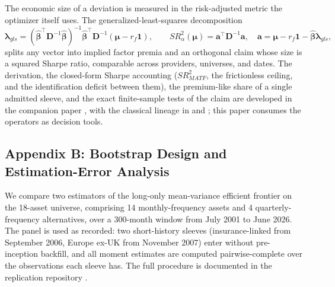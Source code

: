 \documentclass[pdftex,12pt,a4paper]{article}
\begin{document}
The economic size of a deviation is measured in the risk-adjusted metric the optimizer itself uses. The generalized-least-squares decomposition
\begin{equation}\label{eq:gls}
	\boldsymbol\lambda_{gls} = (\hat{\boldsymbol\beta}^\intercal \boldsymbol D^{-1} \hat{\boldsymbol\beta})^{-1}\hat{\boldsymbol\beta}^\intercal \boldsymbol D^{-1}(\boldsymbol\mu - r_f\boldsymbol 1),
	\qquad
	SR^2_{\alpha}(\boldsymbol\mu) = \boldsymbol a^\intercal \boldsymbol D^{-1} \boldsymbol a, \quad \boldsymbol a = \boldsymbol\mu - r_f\boldsymbol 1 - \hat{\boldsymbol\beta}\boldsymbol\lambda_{gls},
\end{equation}
splits any vector into implied factor premia and an orthogonal claim whose size is a squared Sharpe ratio, comparable across providers, universes, and dates. The derivation, the closed-form Sharpe accounting ($SR^2_{MATF}$, the frictionless ceiling, and the identification deficit between them), the premium-like share of a single admitted sleeve, and the exact finite-sample tests of the claim are developed in the companion paper \citep{SeppKastenholzFAJ2026}, with the classical lineage in \citet{Shanken1992} and \citet{CampbellLoMacKinlay1997}; this paper consumes the operators as decision tools.

\subsection*{Appendix B: Bootstrap Design and Estimation-Error Analysis}\label{app:bootstrap_design}

We compare two estimators of the long-only mean-variance efficient frontier on the 18-asset universe, comprising 14 monthly-frequency assets and 4 quarterly-frequency alternatives, over a $300$-month window from July 2001 to June 2026. The panel is used as recorded: two short-history sleeves (insurance-linked from September 2006, Europe ex-UK from November 2007) enter without pre-inception backfill, and all moment estimates are computed pairwise-complete over the observations each sleeve has. The full procedure is documented in the replication repository \citep{MatfCmaCode2026}.
\end{document}
